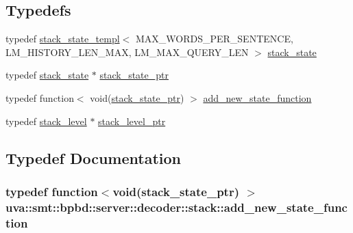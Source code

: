 \subsection*{Typedefs}
\begin{DoxyCompactItemize}
\item 
typedef \hyperlink{classuva_1_1smt_1_1bpbd_1_1server_1_1decoder_1_1stack_1_1stack__state__templ}{stack\+\_\+state\+\_\+templ}$<$ M\+A\+X\+\_\+\+W\+O\+R\+D\+S\+\_\+\+P\+E\+R\+\_\+\+S\+E\+N\+T\+E\+N\+C\+E, L\+M\+\_\+\+H\+I\+S\+T\+O\+R\+Y\+\_\+\+L\+E\+N\+\_\+\+M\+A\+X, L\+M\+\_\+\+M\+A\+X\+\_\+\+Q\+U\+E\+R\+Y\+\_\+\+L\+E\+N $>$ \hyperlink{namespaceuva_1_1smt_1_1bpbd_1_1server_1_1decoder_1_1stack_a30416dfcace69691af43f9f44a076f7e}{stack\+\_\+state}
\item 
typedef \hyperlink{namespaceuva_1_1smt_1_1bpbd_1_1server_1_1decoder_1_1stack_a30416dfcace69691af43f9f44a076f7e}{stack\+\_\+state} $\ast$ \hyperlink{namespaceuva_1_1smt_1_1bpbd_1_1server_1_1decoder_1_1stack_ab08047a5fae45b1c4311bd5d5aa2c4fc}{stack\+\_\+state\+\_\+ptr}
\item 
typedef function$<$ void(\hyperlink{namespaceuva_1_1smt_1_1bpbd_1_1server_1_1decoder_1_1stack_ab08047a5fae45b1c4311bd5d5aa2c4fc}{stack\+\_\+state\+\_\+ptr}) $>$ \hyperlink{namespaceuva_1_1smt_1_1bpbd_1_1server_1_1decoder_1_1stack_a3e1bb866f9fdf44bb23786748b3c791a}{add\+\_\+new\+\_\+state\+\_\+function}
\item 
typedef \hyperlink{classuva_1_1smt_1_1bpbd_1_1server_1_1decoder_1_1stack_1_1stack__level}{stack\+\_\+level} $\ast$ \hyperlink{namespaceuva_1_1smt_1_1bpbd_1_1server_1_1decoder_1_1stack_a31cf19f71615dd8153681ac71e72859d}{stack\+\_\+level\+\_\+ptr}
\end{DoxyCompactItemize}


\subsection{Typedef Documentation}
\hypertarget{namespaceuva_1_1smt_1_1bpbd_1_1server_1_1decoder_1_1stack_a3e1bb866f9fdf44bb23786748b3c791a}{}
\subsubsection[{add\+\_\+new\+\_\+state\+\_\+function}]{\setlength{\rightskip}{0pt plus 5cm}typedef function$<$void({\bf stack\+\_\+state\+\_\+ptr}) $>$ {\bf uva\+::smt\+::bpbd\+::server\+::decoder\+::stack\+::add\+\_\+new\+\_\+state\+\_\+function}}\label{namespaceuva_1_1smt_1_1bpbd_1_1server_1_1decoder_1_1stack_a3e1bb866f9fdf44bb23786748b3c791a}


